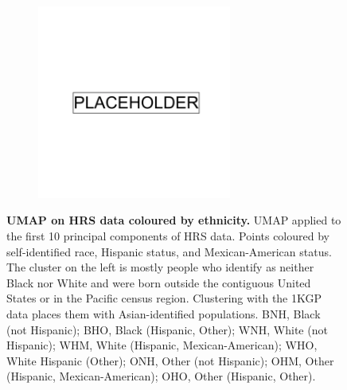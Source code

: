 \begin{figure}
    \centering
    \begin{subfigure}{0.95\textwidth}
    \includegraphics[width=0.7\textwidth]{placeholder.png}
    \end{subfigure}
    \caption[UMAP on HRS data coloured by ethnicity]{\textbf{UMAP on HRS data coloured by ethnicity.} UMAP applied to the first 10 principal components of HRS data. Points coloured by self-identified race, Hispanic status, and Mexican-American status. The cluster on the left is mostly people who identify as neither Black nor White and were born outside the contiguous United States or in the Pacific census region. Clustering with the 1KGP data places them with Asian-identified populations. BNH, Black (not Hispanic); BHO, Black (Hispanic, Other); WNH, White (not Hispanic); WHM, White (Hispanic, Mexican-American); WHO, White Hispanic (Other); ONH, Other (not Hispanic); OHM, Other (Hispanic, Mexican-American); OHO, Other (Hispanic, Other).}
    \label{fig:supp_umap_hrs_eth}
\end{figure}

\newpage

